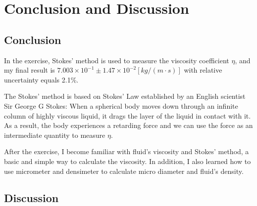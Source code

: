 \documentclass[12pt]{article}
\begin{document}
\section{Conclusion and Discussion}
\subsection{Conclusion}
In the exercise, Stokes' method is used to measure the viscosity coefficient $\eta$, and my final result is $7.003\times10^{-1}\pm1.47\times10^{-2}[kg/(m\cdot{s})]$ with relative uncertainty equals 2.1\%. 
\par The Stokes' method is based on Stokes' Law established by an English scientist Sir George G Stokes: When a spherical body moves down through an infinite column of highly viscous liquid, it drags the layer of the liquid in contact with it. As a result, the body experiences a retarding force and we can use the force as an intermediate quantity to measure $\eta$.
\par After the exercise, I become familiar with fluid's viscosity and Stokes' method, a basic and simple way to calculate the viscosity. In addition, I also learned how to use micrometer and densimeter to calculate micro diameter and fluid's density.
\subsection{Discussion}
\end{document}
